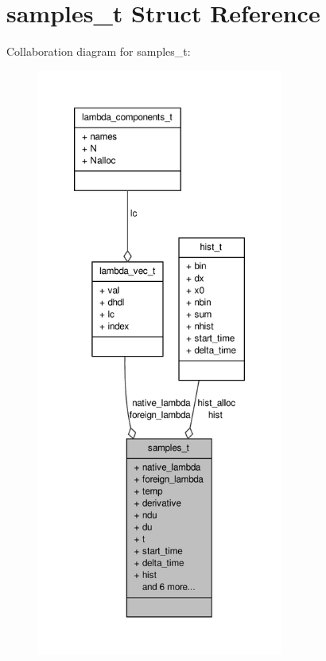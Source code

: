 \hypertarget{structsamples__t}{\section{samples\-\_\-t \-Struct \-Reference}
\label{structsamples__t}
}


\-Collaboration diagram for samples\-\_\-t\-:
\nopagebreak
\begin{figure}[H]
\begin{center}
\leavevmode
\includegraphics[height=550pt]{structsamples__t__coll__graph}
\end{center}
\end{figure}
